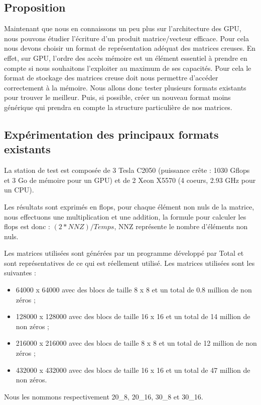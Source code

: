 \documentclass[renpar]{compas2013}
\begin{document}
  \subsection{Proposition}
   Maintenant que nous en connaissons un peu plus sur l'architecture des
   GPU, nous pouvons étudier l'écriture d'un produit matrice/vecteur efficace.
   Pour cela nous devons choisir un format de représentation adéquat des matrices
   creuses. En effet, sur GPU, l'ordre des accès mémoire est un élément essentiel à prendre
   en compte si nous souhaitons l'exploiter au maximum de ses capacités. Pour cela
   le format de stockage des matrices creuse doit nous permettre d'accéder
   correctement à la mémoire. Nous allons donc tester plusieurs
   formats existants pour trouver le meilleur. Puis, si possible, créer
   un nouveau format moins générique qui prendra en compte la structure
   particulière de nos matrices. 


   \subsection{Expérimentation des principaux formats existants}
    La station de test est composée de 3 Tesla C2050 (puissance crête :
    1030 Gflops et 3 Go de mémoire pour un GPU) et de 2 Xeon X5570 (4 coeurs,
    2.93 GHz pour un CPU).
    
    Les résultats sont exprimés en flops, pour chaque élément non nuls
    de la matrice, nous effectuons une multiplication et une addition, la
    formule pour calculer les flops est donc : $(2 * NNZ) / Temps$, NNZ
    représente le nombre d'éléments non nuls.
    
    Les matrices utilisées sont générées par un programme développé par
    Total et sont représentatives de ce qui est réellement utilisé.
    Les matrices utilisées sont les suivantes :
    \begin{itemize}
      \item 64000 x 64000 avec des blocs de taille 8 x 8 et un total de 0.8 million de non zéros ;
      \item 128000 x 128000 avec des blocs de taille 16 x 16 et un total de 14 million de non zéros ;
      \item 216000 x 216000 avec des blocs de taille 8 x 8 et un total de 12 million de non zéros ;
      \item 432000 x 432000 avec des blocs de taille 16 x 16 et un total de 47 million de non zéros.
    \end{itemize}
    Nous les nommons respectivement 20\_8, 20\_16, 30\_8 et 30\_16.
\end{document}
